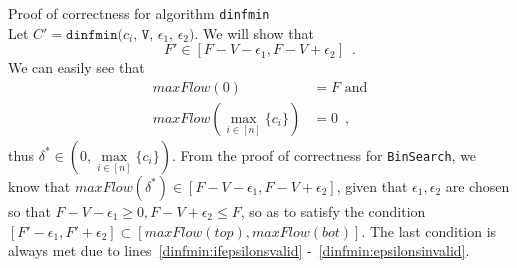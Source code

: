 \begin{sepproof}{Proof of correctness for algorithm \texttt{dinfmin}} \ \\
  Let $C' = \texttt{dinfmin(}c_i\texttt{, V, } \epsilon_1\texttt{, } \epsilon_2\texttt{)}$. We will show that
  \begin{equation*}
    F' \in [F - V - \epsilon_1, F - V + \epsilon_2] \enspace.
  \end{equation*}
  We can easily see that
  \begin{align*}
    maxFlow\left(0\right) &= F \mbox{ and} \\
    maxFlow\left(\max\limits_{i \in [n]}\{c_i\}\right) &= 0 \enspace,
  \end{align*}
  thus $\delta^* \in \left(0, \max\limits_{i \in [n]}\{c_i\}\right)$. From the proof of correctness for \texttt{BinSearch},
  we know that $maxFlow\left(\delta^*\right) \in \left[F - V - \epsilon_1, F - V + \epsilon_2\right]$, given that
  $\epsilon_1, \epsilon_2$ are chosen so that $F - V - \epsilon_1 \geq 0, F - V + \epsilon_2 \leq F$, so as to satisfy the
  condition $\left[F' - \epsilon_1, F' + \epsilon_2\right] \subset \left[maxFlow\left(top\right),
  maxFlow\left(bot\right)\right]$. The last condition is always met due to lines~\ref{dinfmin:ifepsilonsvalid}
  -~\ref{dinfmin:epsilonsinvalid}.
\end{sepproof}
